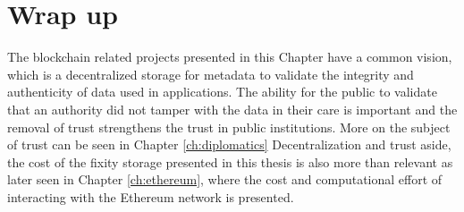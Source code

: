 \section{Wrap up}
The blockchain related projects presented in this Chapter have a common vision, which is a decentralized storage for metadata to validate the integrity and authenticity of data used in applications. The ability for the public to validate that an authority did not tamper with the data in their care is important and the removal of trust strengthens the trust in public institutions. More on the subject of trust can be seen in Chapter \ref{ch:diplomatics}
Decentralization and trust aside, the cost of the fixity storage presented in this thesis is also more than relevant as later seen in Chapter \ref{ch:ethereum}, where the cost and computational effort of interacting with the Ethereum network is presented.
